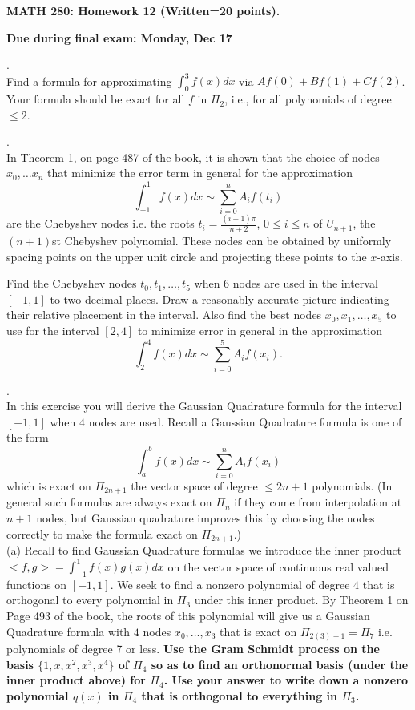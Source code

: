 \documentclass[12 pt]{article}
\begin{document}
\centerline{\bf MATH 280: Homework 12 (Written=20 points). }
\centerline{\bf Due during final exam: Monday, Dec 17}

\bigskip

. \\ Find a formula for approximating $\int_{0}^3 f(x) dx$ 
via $Af(0) + Bf(1) + Cf(2)$. Your formula should be exact for all $f$ in $\Pi_2$, i.e., for all polynomials 
of degree $\leq 2$.

\medskip

. \\ In Theorem 1, on page 487 of the book, it is shown that the choice of nodes $x_0, \dots x_n$ that minimize 
the error term in general for the approximation 
$$
\int_{-1}^1 f(x)dx \sim \sum_{i=0}^n A_i f(t_i)
$$
are the Chebyshev nodes i.e. the roots $t_i=\frac{(i+1)\pi}{n+2}$, $0 \leq i \leq n$ of $U_{n+1}$, the $(n+1)$st Chebyshev polynomial.
These nodes can be obtained by uniformly spacing points on the upper unit circle and projecting these points to the $x$-axis.

Find the Chebyshev nodes $t_0, t_1, \dots, t_5$ when $6$ nodes are used in the interval $[-1,1]$ to two decimal places. Draw a reasonably accurate picture 
indicating their relative placement in the interval.
Also find the best nodes $x_0, x_1, \dots, x_5$ to use for the interval $[2,4]$ to minimize error in general in the approximation
$$
\int_2^4 f(x)dx \sim \sum_{i=0}^5 A_i f(x_i).
$$

\medskip

. \\ In this exercise you will derive the Gaussian Quadrature formula for the interval $[-1,1]$ when $4$ nodes are used.
Recall a Gaussian Quadrature formula is one of the form 
$$
\int_a^b f(x) dx \sim \sum_{i=0}^n A_i f(x_i)
$$
which is exact on $\Pi_{2n+1}$ the vector space of degree $\leq 2n+1$ polynomials. (In general such formulas are always exact on $\Pi_n$ if 
they come from interpolation at $n+1$ nodes, but Gaussian quadrature improves this by choosing the nodes correctly to make the formula exact on $\Pi_{2n+1}$.) \\
(a) Recall to find Gaussian Quadrature formulas we introduce the inner product 
$<f,g> = \int_{-1}^1 f(x) g(x) dx$ on the vector space of continuous real valued functions on $[-1,1]$. We seek to find a nonzero polynomial 
of degree $4$ that is orthogonal to every polynomial in $\Pi_3$ under this inner product. By Theorem 1 on Page 493 of the book, the roots of this polynomial will 
give us a Gaussian Quadrature formula with $4$ nodes $x_0, \dots, x_3$ that is exact on $\Pi_{2(3)+1}=\Pi_7$ i.e. polynomials of degree 7 or less. 
{\bf Use the Gram Schmidt process on the basis $\{1,x, x^2, x^3, x^4\}$ of $\Pi_4$ so as to find an orthonormal basis (under the inner product above) for 
$\Pi_4$. Use your answer to write down a nonzero polynomial $q(x)$ in $\Pi_4$ that is orthogonal to everything in $\Pi_3$.}
\end{document}
